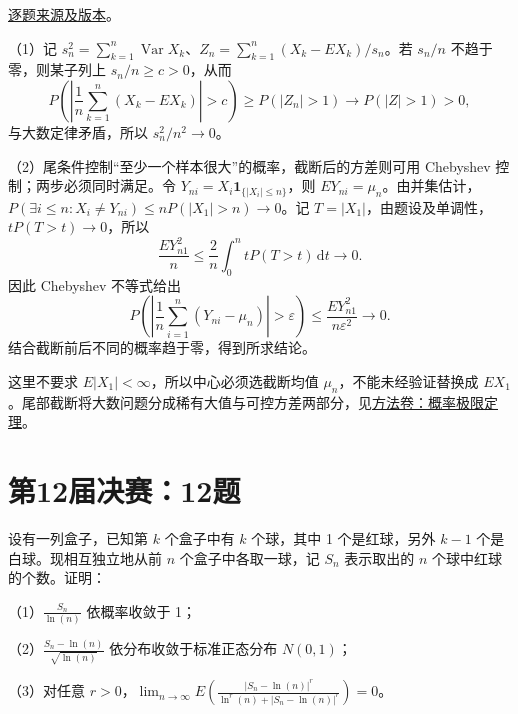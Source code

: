 \documentclass[UTF8,12pt,a4paper,fontset=fandol]{ctexbook}
\begin{document}
\href{https://github.com/lzxcr/cmc-mathematics/blob/64916fa1fdbc3e444a652eca204d5669058ee321/src/problems/finals/11/14.md}{逐题来源及版本}。

\begin{solve}

（1）记 $s_n^2=\sum_{k=1}^n\operatorname{Var}X_k$、$Z_n=\sum_{k=1}^n(X_k-EX_k)/s_n$。若 $s_n/n$ 不趋于零，则某子列上 $s_n/n\geq c>0$，从而
\[
P\left(\left|\frac1n\sum_{k=1}^n(X_k-EX_k)\right|>c\right)\geq P(|Z_n|>1)\longrightarrow P(|Z|>1)>0,
\]
与大数定律矛盾，所以 $s_n^2/n^2\to0$。

（2）尾条件控制“至少一个样本很大”的概率，截断后的方差则可用 Chebyshev 控制；两步必须同时满足。令 $Y_{ni}=X_i\mathbf1_{\{|X_i|\leq n\}}$，则 $EY_{ni}=\mu_n$。由并集估计，$P(\exists i\leq n:X_i\ne Y_{ni})\leq nP(|X_1|>n)\to0$。记 $T=|X_1|$，由题设及单调性，$tP(T>t)\to0$，所以
\[
\frac{EY_{n1}^2}{n}\leq\frac2n\int_0^ntP(T>t)\,\mathrm dt\longrightarrow0.
\]
因此 Chebyshev 不等式给出
\[
P\left(\left|\frac1n\sum_{i=1}^n(Y_{ni}-\mu_n)\right|>\varepsilon\right)
\leq\frac{EY_{n1}^2}{n\varepsilon^2}\longrightarrow0.
\]
结合截断前后不同的概率趋于零，得到所求结论。

\end{solve}

\begin{remark}[方法与条件]

这里不要求 $E|X_1|<\infty$，所以中心必须选截断均值 $\mu_n$，不能未经验证替换成 $EX_1$。尾部截断将大数问题分成稀有大值与可控方差两部分，见\hyperref[app:probability-limit]{方法卷：概率极限定理}。

\end{remark}

\section{第12届决赛：12题}\label{pr:fin12-high:12}

\begin{example}[公开题解转录]\label{q:fin12-high:12}

设有一列盒子，已知第 $k$ 个盒子中有 $k$ 个球，其中 1 个是红球，另外 $k-1$ 个是白球。现相互独立地从前 $n$ 个盒子中各取一球，记 $S_n$ 表示取出的 $n$ 个球中红球的个数。证明：

（1）$\frac{S_n}{\ln(n)}$ 依概率收敛于 1；

（2）$\frac{S_n - \ln(n)}{\sqrt{\ln(n)}}$ 依分布收敛于标准正态分布 $N(0,1)$；

（3）对任意 $r > 0$，$\lim_{n \to \infty} E\left(\frac{\left|S_n - \ln(n)\right|^r}{\ln^r(n) + \left|S_n - \ln(n)\right|^r}\right) = 0$。

\end{example}
\end{document}
